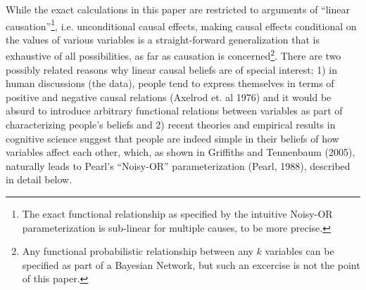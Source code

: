 \documentclass[12pt]{article}
\begin{document}
While the exact calculations in this paper are restricted to arguments of ``linear causation''\footnote{The exact functional relationship as specified by the intuitive Noisy-OR parameterization is sub-linear for multiple causes, to be more precise.}, i.e. unconditional causal effects, making causal effects conditional on the values of various variables is a straight-forward generalization that is exhaustive of all possibilities, as far as causation is concerned\footnote{Any functional probabilistic relationship between any $k$ variables can be specified as part of a Bayesian Network, but such an excercise is not the point of this paper.}. There are two possibly related reasons why linear causal beliefs are of special interest; 1) in human discussions (the data), people tend to express themselves in terms of positive and negative causal relations (Axelrod et. al 1976) and it would be absurd to introduce arbitrary functional relations between variables as part of characterizing people's beliefs and 2) recent theories and empirical results in cognitive science suggest that people are indeed simple in their beliefs of how variables affect each other, which, as shown in Griffiths and Tennenbaum (2005), naturally leads to Pearl's ``Noisy-OR'' parameterization (Pearl, 1988), described in detail below.\\
\end{document}
